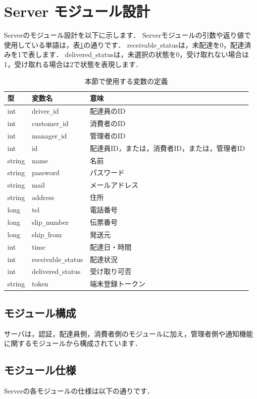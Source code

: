 \documentclass[a4j,titlepage]{jarticle}
\begin{document}
\section{Server モジュール設計}
Serverのモジュール設計を以下に示します．
Serverモジュールの引数や返り値で使用している単語は，表\ref{serverTable}の通りです．
receivable\verb|_|statusは，未配達を0，配達済みを1で表します．
delivered\verb|_|statusは，未選択の状態を0，受け取れない場合は1，受け取れる場合は2で状態を表現します．
\begin{table}[htb]
\centering
\caption{本節で使用する変数の定義}
\label{serverTable}
\begin{tabular}{|lll|}
\hline
型 & 変数名 & 意味      \\ \hline
int & driver\verb|_|id & 配達員のID     \\
int & customer\verb|_|id & 消費者のID     \\
int & manager\verb|_|id & 管理者のID     \\
int & id & 配達員ID，または，消費者ID，または，管理者ID     \\
string  & name  & 名前     \\
string & password & パスワード     \\
string & mail & メールアドレス     \\
string & address & 住所     \\
long & tel & 電話番号     \\
long  &  slip\verb|_|number  & 伝票番号   \\
long & ship\verb|_|from & 発送元     \\
int & time & 配達日・時間     \\
int & receivable\verb|_|status & 配達状況    \\
int & delivered\verb|_|status  &  受け取り可否  \\
string & token & 端末登録トークン \\ \hline
\end{tabular}
\end{table}
\clearpage

\subsection{モジュール構成}
サーバは，認証，配達員側，消費者側のモジュールに加え，管理者側や通知機能に関するモジュールから構成されています．

\subsection{モジュール仕様}
Serverの各モジュールの仕様は以下の通りです．
\end{document}
